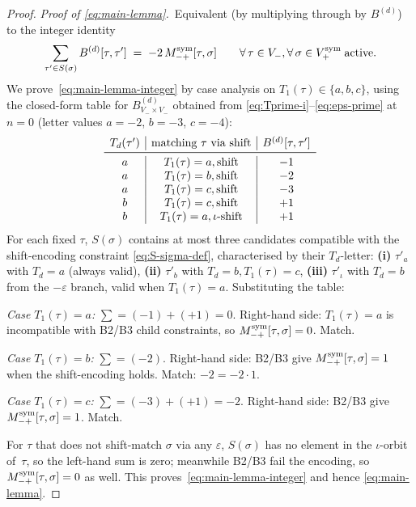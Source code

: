 \documentclass{amsart}
\theoremstyle{definition}
\theoremstyle{remark}
\begin{document}
\begin{proof}
\textit{Proof of \eqref{eq:main-lemma}.}\
Equivalent (by multiplying through by $B^{(d)}$) to the
integer identity
\begin{equation}\label{eq:main-lemma-integer}
  \sum_{\tau' \in S(\sigma)} B^{(d)}[\tau, \tau']
  \;=\; -2\, M_{-+}^{\rm sym}[\tau, \sigma]
  \qquad \forall\, \tau \in V_-, \forall\, \sigma \in
        V_+^{\rm sym}\;\text{active}.
\end{equation}
We prove~\eqref{eq:main-lemma-integer} by case analysis on
$T_1(\tau) \in \{a, b, c\}$, using the closed-form table for
$B^{(d)}_{V_- \times V_-}$ obtained from
\eqref{eq:Tprime-i}--\eqref{eq:eps-prime} at $n = 0$ (letter
values $a = -2$, $b = -3$, $c = -4$):
\[
\begin{array}{c|c|c}
  T_d(\tau') & \text{matching $\tau$ via shift} &
        B^{(d)}[\tau, \tau'] \\
  \midrule
  a & T_1(\tau) = a, \text{shift} & -1 \\
  a & T_1(\tau) = b, \text{shift} & -2 \\
  a & T_1(\tau) = c, \text{shift} & -3 \\
  b & T_1(\tau) = c, \text{shift} & +1 \\
  b & T_1(\tau) = a, \iota\text{-shift} & +1
\end{array}
\]
For each fixed $\tau$, $S(\sigma)$ contains at most three
candidates compatible with the shift-encoding constraint
\eqref{eq:S-sigma-def}, characterised by their $T_d$-letter:
\textbf{(i)} $\tau'_a$ with $T_d = a$ (always valid),
\textbf{(ii)} $\tau'_b$ with $T_d = b, T_1(\tau) = c$,
\textbf{(iii)} $\tau'_\iota$ with $T_d = b$ from the
$-\varepsilon$ branch, valid when $T_1(\tau) = a$.  Substituting
the table:

\smallskip\noindent\emph{Case $T_1(\tau) = a$:}
$\sum = (-1) + (+1) = 0$.  Right-hand side: $T_1(\tau) = a$ is
incompatible with B2/B3 child constraints, so
$M_{-+}^{\rm sym}[\tau, \sigma] = 0$.  Match.

\smallskip\noindent\emph{Case $T_1(\tau) = b$:}
$\sum = (-2)$.  Right-hand side: B2/B3 give
$M_{-+}^{\rm sym}[\tau, \sigma] = 1$ when the shift-encoding
holds.  Match: $-2 = -2 \cdot 1$.

\smallskip\noindent\emph{Case $T_1(\tau) = c$:}
$\sum = (-3) + (+1) = -2$.  Right-hand side: B2/B3 give
$M_{-+}^{\rm sym}[\tau, \sigma] = 1$.  Match.

\smallskip\noindent
For $\tau$ that does not shift-match $\sigma$ via any
$\varepsilon$, $S(\sigma)$ has no element in the $\iota$-orbit
of~$\tau$, so the left-hand sum is zero; meanwhile B2/B3 fail
the encoding, so $M_{-+}^{\rm sym}[\tau, \sigma] = 0$ as well.
This proves~\eqref{eq:main-lemma-integer} and hence
\eqref{eq:main-lemma}.


\end{proof}
\end{document}
